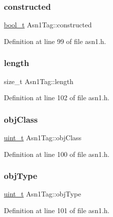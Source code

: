\subsubsection{\texorpdfstring{constructed}{constructed}}
{\footnotesize\ttfamily \hyperlink{compiler__port_8h_a812d16e5494522586b3784e55d479912}{bool\+\_\+t} Asn1\+Tag\+::constructed}



Definition at line 99 of file asn1.\+h.

\mbox{\label{structAsn1Tag_a5131e751817ae2cbfdaf031c2ce97f3d}} 
\subsubsection{\texorpdfstring{length}{length}}
{\footnotesize\ttfamily size\+\_\+t Asn1\+Tag\+::length}



Definition at line 102 of file asn1.\+h.

\mbox{\label{structAsn1Tag_a9f35c291ffa22d903d9c66638bb225ea}} 
\subsubsection{\texorpdfstring{obj\+Class}{objClass}}
{\footnotesize\ttfamily \hyperlink{compiler__port_8h_a12a1e9b3ce141648783a82445d02b58d}{uint\+\_\+t} Asn1\+Tag\+::obj\+Class}



Definition at line 100 of file asn1.\+h.

\mbox{\label{structAsn1Tag_a3ecdc4bbf328b5216521cb2114f45935}} 
\subsubsection{\texorpdfstring{obj\+Type}{objType}}
{\footnotesize\ttfamily \hyperlink{compiler__port_8h_a12a1e9b3ce141648783a82445d02b58d}{uint\+\_\+t} Asn1\+Tag\+::obj\+Type}



Definition at line 101 of file asn1.\+h.

